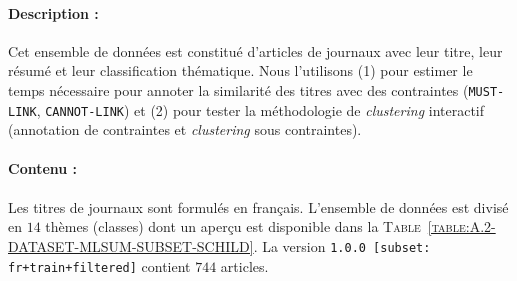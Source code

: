 	
	\paragraph{Description :}
	Cet ensemble de données est constitué d'articles de journaux avec leur titre, leur résumé et leur classification thématique.
	Nous l'utilisons (1) pour estimer le temps nécessaire pour annoter la similarité des titres avec des contraintes (\texttt{MUST-LINK}, \texttt{CANNOT-LINK}) et (2) pour tester la méthodologie de \textit{clustering} interactif (annotation de contraintes et \textit{clustering} sous contraintes).
	
	\paragraph{Contenu :}
	Les titres de journaux sont formulés en français.
	L'ensemble de données est divisé en $14$ thèmes (classes) dont un aperçu est disponible dans la \textsc{Table~\ref{table:A.2-DATASET-MLSUM-SUBSET-SCHILD}}.
	La version \texttt{1.0.0 [subset: fr+train+filtered]} contient $744$ articles.
	
